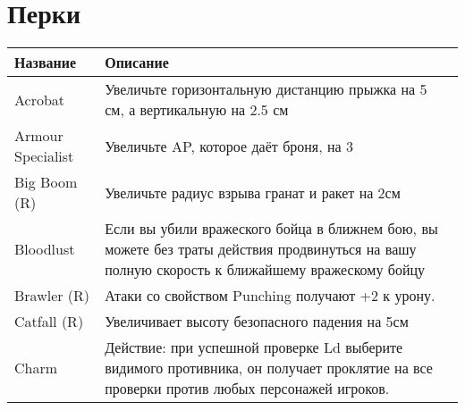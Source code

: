 \section*{Перки}
\begin{table}[h]
    \begin{tabularx}{\textwidth}{|l|X|}
    \hline
    Название           & Описание                                                                                                                                                                                                                           \\ \hline
    Acrobat            & Увеличьте горизонтальную дистанцию прыжка на 5 см, а вертикальную на 2.5 см                                                                                                                                                        \\ \hline
    Armour Specialist  & Увеличьте AP, которое даёт броня, на 3                                                                                                                                                                                             \\ \hline
    Big Boom (R)       & Увеличьте радиус взрыва гранат и ракет на 2см                                                                                                                                                                                      \\ \hline
    Bloodlust          & Если вы убили вражеского бойца в ближнем бою, вы можете без траты действия продвинуться на вашу полную скорость к ближайшему вражескому бойцу                                                                                      \\ \hline
    Brawler (R)        & Атаки со свойством Punching получают +2 к урону.                                                                                                                                                                                   \\ \hline
    Catfall (R)        & Увеличивает высоту безопасного падения на 5см                                                                                                                                                                                      \\ \hline
    Charm              & Действие: при успешной проверке Ld выберите видимого противника, он получает проклятие на все проверки против любых персонажей игроков.                                                                                            \\ \hline

\end{tabularx}
\end{table}
